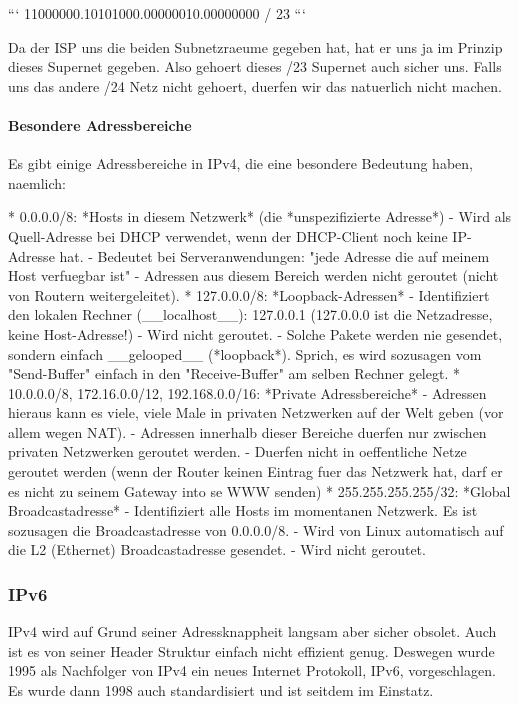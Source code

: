 ```
11000000.10101000.00000010.00000000 / 23
```

Da der ISP uns die beiden Subnetzraeume gegeben hat, hat er uns ja im Prinzip
dieses Supernet gegeben. Also gehoert dieses /23 Supernet auch sicher uns. Falls
uns das andere /24 Netz nicht gehoert, duerfen wir das natuerlich nicht machen.

\paragraph{Besondere Adressbereiche} 

Es gibt einige Adressbereiche in IPv4, die eine besondere Bedeutung haben,
naemlich:

* 0.0.0.0/8: *Hosts in diesem Netzwerk* (die *unspezifizierte Adresse*)
  - Wird als Quell-Adresse bei DHCP verwendet, wenn der DHCP-Client noch keine
    IP-Adresse hat.
  - Bedeutet bei Serveranwendungen: "jede Adresse die auf meinem Host verfuegbar
    ist"
  - Adressen aus diesem Bereich werden nicht geroutet (nicht von Routern
    weitergeleitet).
* 127.0.0.0/8: *Loopback-Adressen*
  - Identifiziert den lokalen Rechner (\_\_localhost\_\_): 127.0.0.1 (127.0.0.0 ist
    die Netzadresse, keine Host-Adresse!)
  - Wird nicht geroutet.
  - Solche Pakete werden nie gesendet, sondern einfach \_\_gelooped\_\_
    (*loopback*). Sprich, es wird sozusagen vom "Send-Buffer" einfach in den
    "Receive-Buffer" am selben Rechner gelegt.
* 10.0.0.0/8, 172.16.0.0/12, 192.168.0.0/16: *Private Adressbereiche*
  - Adressen hieraus kann es viele, viele Male in privaten Netzwerken auf der
    Welt geben (vor allem wegen NAT).
  - Adressen innerhalb dieser Bereiche duerfen nur zwischen privaten Netzwerken
    geroutet werden.
  - Duerfen nicht in oeffentliche Netze geroutet werden (wenn der Router keinen
    Eintrag fuer das Netzwerk hat, darf er es nicht zu seinem Gateway into se
    WWW senden)
* 255.255.255.255/32: *Global Broadcastadresse*
  - Identifiziert alle Hosts im momentanen Netzwerk. Es ist sozusagen die
    Broadcastadresse von 0.0.0.0/8.
  - Wird von Linux automatisch auf die L2 (Ethernet) Broadcastadresse gesendet.
  - Wird nicht geroutet.

\subsubsection{IPv6} 

IPv4 wird auf Grund seiner Adressknappheit langsam aber sicher obsolet. Auch ist
es von seiner Header Struktur einfach nicht effizient genug. Deswegen wurde 1995
als Nachfolger von IPv4 ein neues Internet Protokoll, IPv6, vorgeschlagen. Es
wurde dann 1998 auch standardisiert und ist seitdem im Einstatz.

